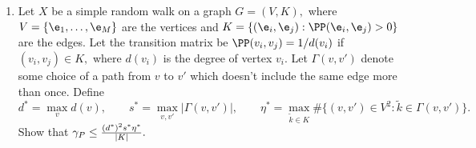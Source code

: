 \documentclass[a4paper,12pt]{article}
\begin{document}
\begin{enumerate}
\item Let $X$ be a simple random walk on a graph $G=(V,K),$ where $V=\{\e_1,\ldots,\e_M\}$ are the vertices and $K=\{(\e_i,\e_j): \PP(\e_i,\e_j)>0\}$ are the edges. Let the transition matrix be $\PP(v_i,v_j)=1/d(v_i)$ if $(v_i,v_j)\in K,$ where $d(v_i)$ is the degree of vertex $v_i.$ Let $\Gamma(v,v')$ denote some choice of a path from $v$ to $v'$ which doesn't include the same edge more than once. Define 
$$d^*=\max_v d(v),\qquad  s^*=\max_{v,v'} |\Gamma(v,v')|,  \qquad \eta^*=\max_{\tilde{k}\in K} \#\{(v,v')\in V^2: \tilde{k}\in\Gamma(v,v')\}.$$
Show that $\gamma_P\leq {(d^*)^2 s^* \eta^*\over |K|}.$
 
 \end{enumerate}
\end{document}
